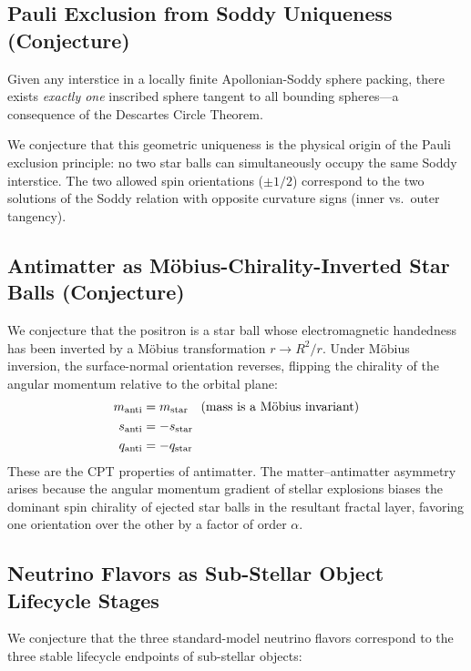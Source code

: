 \documentclass[11pt,a4paper]{article}
\begin{document}
\subsection{Pauli Exclusion from Soddy Uniqueness (Conjecture)}

Given any interstice in a locally finite Apollonian-Soddy sphere packing, there exists \emph{exactly one} inscribed sphere tangent to all bounding spheres---a consequence of the Descartes Circle Theorem.

We conjecture that this geometric uniqueness is the physical origin of the Pauli exclusion principle: no two star balls can simultaneously occupy the same Soddy interstice. The two allowed spin orientations ($\pm 1/2$) correspond to the two solutions of the Soddy relation with opposite curvature signs (inner vs.\ outer tangency).

\subsection{Antimatter as Möbius-Chirality-Inverted Star Balls (Conjecture)}

We conjecture that the positron is a star ball whose electromagnetic handedness has been inverted by a Möbius transformation $r \to R^2/r$. Under Möbius inversion, the surface-normal orientation reverses, flipping the chirality of the angular momentum relative to the orbital plane:
\begin{align*}
m_{\rm anti} &= m_{\rm star} \quad
  \text{(mass is a Möbius invariant)} \\
s_{\rm anti} &= -s_{\rm star} \\
q_{\rm anti} &= -q_{\rm star}
\end{align*}
These are the CPT properties of antimatter. The matter--antimatter asymmetry arises because the angular momentum gradient of stellar explosions biases the dominant spin chirality of ejected star balls in the resultant fractal layer, favoring one orientation over the other by a factor of order $\alpha$.

\subsection{Neutrino Flavors as Sub-Stellar Object Lifecycle Stages}

We conjecture that the three standard-model neutrino flavors correspond to the three stable lifecycle endpoints of sub-stellar objects:
\end{document}
